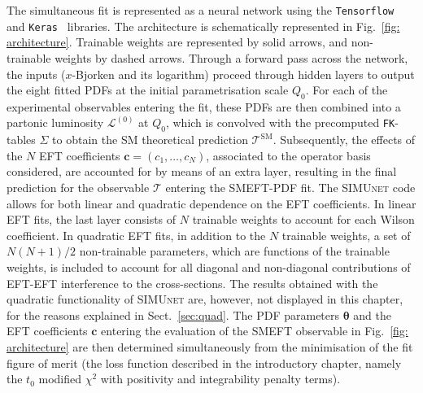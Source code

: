 \documentclass[withindex,glossary]{cam-thesis}
\newcommand{\simunet}{\textsc{SIMUnet}}
\begin{document}
The simultaneous fit is represented as a neural network using the
\texttt{Tensorflow}~\cite{tensorflow2015:whitepaper} and
\texttt{Keras}~\cite{chollet2015keras} libraries. The architecture is
schematically represented in Fig.~\ref{fig: architecture}.
%
Trainable weights are represented by solid arrows, and
non-trainable weights by dashed arrows.  Through a
forward pass across the network, the inputs ($x$-Bjorken and its logarithm) proceed through
 hidden layers  to output the eight fitted PDFs at
the initial parametrisation scale $Q_0$.
%
For each of the experimental observables entering the fit, these
PDFs are then combined into a partonic luminosity $\mathcal{L}^{(0)}$ at $Q_0$,
which is convolved with the precomputed {\tt FK}-tables $\Sigma$ to obtain the SM
theoretical prediction $\mathcal{T}^\text{SM}$.
%
%
Subsequently, the effects of the $N$ EFT coefficients $\boldsymbol{c}=(c_1,\ldots,c_N)$,
associated to the operator basis considered,
are accounted for by means of an extra layer, resulting in the
final prediction for the observable $\mathcal{T}$ entering the SMEFT-PDF fit.
%
The \simunet{} code allows for both linear and quadratic dependence on the EFT
coefficients. In linear EFT fits, the last layer consists of $N$ trainable
weights to account for each Wilson coefficient. In quadratic EFT fits, in
addition to the $N$ trainable weights, a set of $N(N+1)/2$ non-trainable
parameters, which are functions of the trainable weights, is included to account
for all diagonal and non-diagonal contributions of EFT-EFT interference to the
cross-sections. The results obtained with the quadratic functionality
of \simunet{} are, however, not displayed in this chapter, for the reasons explained in
Sect.~\ref{sec:quad}. 
The PDF parameters $\pmb{\theta}$
and the EFT coefficients $\boldsymbol{c}$ entering the evaluation
of the SMEFT observable in Fig.~\ref{fig: architecture} are then determined
simultaneously from the minimisation of the fit figure of merit (the loss function
described in the introductory chapter, namely the $t_0$ modified $\chi^2$ with
positivity and integrability penalty terms).
\end{document}
